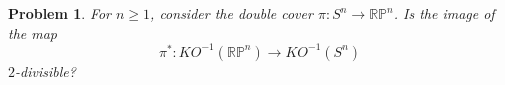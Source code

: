 \documentclass{amsart}
\newtheorem*{problem*}{Problem}
\def\RP{\mathbb{RP}}
\def\KO{\mathit{KO}}
\newcommand{\from}{\colon}
\begin{document}
\begin{problem*}
  For $n \geq 1$, consider the double cover $\pi\from S^n \to \RP^n$. Is the image of the map
  \[
  \pi^*\from \KO^{-1}(\RP^n) \to \KO^{-1}(S^n)
  \]
  $2$-divisible?
\end{problem*}
\end{document}

